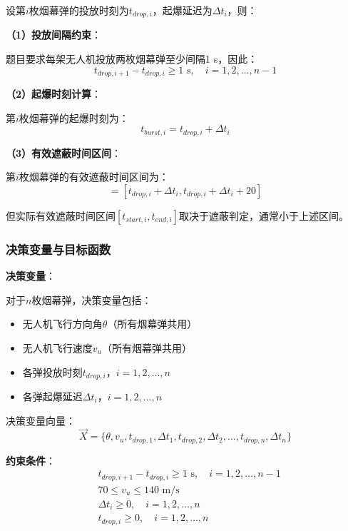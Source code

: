 \documentclass[12pt,a4paper]{article}
\begin{document}
\indent 设第$i$枚烟幕弹的投放时刻为$t_{drop,i}$，起爆延迟为$\Delta t_i$，则：

\noindent\textbf{（1）投放间隔约束}：

\indent 题目要求每架无人机投放两枚烟幕弹至少间隔1 s，因此：
\begin{equation}
t_{drop,i+1} - t_{drop,i} \geq 1 \text{ s}, \quad i = 1, 2, \ldots, n-1
\end{equation}

\noindent\textbf{（2）起爆时刻计算}：

\indent 第$i$枚烟幕弹的起爆时刻为：
\begin{equation}
t_{burst,i} = t_{drop,i} + \Delta t_i
\end{equation}

\noindent\textbf{（3）有效遮蔽时间区间}：

\indent 第$i$枚烟幕弹的有效遮蔽时间区间为：
\begin{equation}
[t_{burst,i}, t_{burst,i} + T_{valid}] = [t_{drop,i} + \Delta t_i, t_{drop,i} + \Delta t_i + 20]
\end{equation}

\indent 但实际有效遮蔽时间区间$[t_{start,i}, t_{end,i}]$取决于遮蔽判定，通常小于上述区间。

\subsubsection{决策变量与目标函数}

\noindent\textbf{决策变量}：

\indent 对于$n$枚烟幕弹，决策变量包括：
\begin{itemize}
\item 无人机飞行方向角$\theta$（所有烟幕弹共用）
\item 无人机飞行速度$v_u$（所有烟幕弹共用）
\item 各弹投放时刻$t_{drop,i}$，$i = 1, 2, \ldots, n$
\item 各弹起爆延迟$\Delta t_i$，$i = 1, 2, \ldots, n$
\end{itemize}

\indent 决策变量向量：
\begin{equation}
\vec{X} = \{\theta, v_u, t_{drop,1}, \Delta t_1, t_{drop,2}, \Delta t_2, \ldots, t_{drop,n}, \Delta t_n\}
\end{equation}

\noindent\textbf{约束条件}：
\begin{align}
& t_{drop,i+1} - t_{drop,i} \geq 1 \text{ s}, \quad i = 1, 2, \ldots, n-1 \\
& 70 \leq v_u \leq 140 \text{ m/s} \\
& \Delta t_i \geq 0, \quad i = 1, 2, \ldots, n \\
& t_{drop,i} \geq 0, \quad i = 1, 2, \ldots, n
\end{align}
\end{document}
